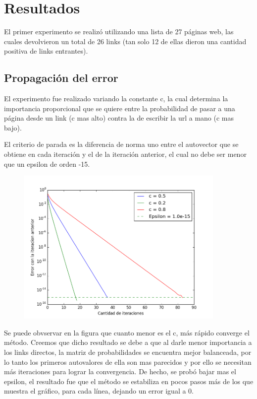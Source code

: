 \section{Resultados}

El primer experimento se realiz\'o utilizando una lista de 27 p\'aginas web, las cuales devolvieron un
total de 26 links (tan solo 12 de ellas dieron una cantidad positiva de links entrantes).

\subsection{Propagaci\'on del error}

El experimento fue realizado variando la constante c, la cual determina la importancia proporcional que se quiere
entre la probabilidad de pasar a una p\'agina desde un link (c mas alto) contra la de escribir la url a mano (c mas bajo).

El criterio de parada es la diferencia de norma uno entre el autovector que se obtiene
en cada iteraci\'on y el de la iteraci\'on anterior, el cual no debe ser menor que un
epsilon de orden -15.

\begin{figure}[H]
  \centering
    \includegraphics[width=0.9\textwidth]{../parser/graficoError1.png}
    \caption{}
    \label{}
\end{figure}

Se puede obvservar en la figura que cuanto menor es el c, m\'as r\'apido converge
el m\'etodo. Creemos que dicho resultado se debe a que al darle menor importancia
a los links directos, la matriz de probabilidades se encuentra mejor balanceada, 
por lo tanto los primeros autovalores de ella son mas parecidos y por ello se necesitan
m\'as iteraciones para lograr la convergencia. De hecho, se prob\'o bajar mas el epsilon,
el resultado fue que el m\'etodo se estabiliza en pocos pasos m\'as de los que muestra el gr\'afico,
para cada l\'inea, dejando un error igual a 0.

